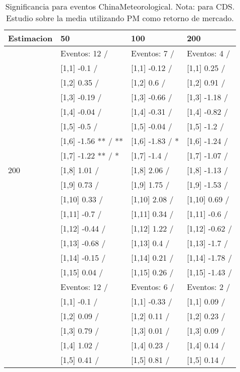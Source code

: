 \begin{table}

\caption{Significancia para eventos ChinaMeteorological. Nota: para CDS. Estudio sobre la media utilizando PM como retorno de mercado.}
\centering
\begin{tabular}[t]{llll}
\toprule
Estimacion & 50 & 100 & 200\\
\midrule
 & Eventos:  12 / & Eventos:  7 / & Eventos:  4 /\\
 & {}[1,1] -0.1  / & {}[1,1] -0.12  / & {}[1,1] 0.25  /\\
 & {}[1,2] 0.35  / & {}[1,2] 0.6  / & {}[1,2] 0.91  /\\
 & {}[1,3] -0.19  / & {}[1,3] -0.66  / & {}[1,3] -1.18  /\\
 & {}[1,4] -0.04  / & {}[1,4] -0.31  / & {}[1,4] -0.82  /\\
\addlinespace
 & {}[1,5] -0.5  / & {}[1,5] -0.04  / & {}[1,5] -1.2  /\\
 & {}[1,6] -1.56 ** / ** & {}[1,6] -1.83  / * & {}[1,6] -1.24  /\\
 & {}[1,7] -1.22 ** / * & {}[1,7] -1.4  / & {}[1,7] -1.07  /\\
200 & {}[1,8] 1.01  / & {}[1,8] 2.06  / & {}[1,8] -1.13  /\\
 & {}[1,9] 0.73  / & {}[1,9] 1.75  / & {}[1,9] -1.53  /\\
\addlinespace
 & {}[1,10] 0.33  / & {}[1,10] 2.08  / & {}[1,10] 0.69  /\\
 & {}[1,11] -0.7  / & {}[1,11] 0.34  / & {}[1,11] -0.6  /\\
 & {}[1,12] -0.44  / & {}[1,12] 1.22  / & {}[1,12] -0.62  /\\
 & {}[1,13] -0.68  / & {}[1,13] 0.4  / & {}[1,13] -1.7  /\\
 & {}[1,14] -0.15  / & {}[1,14] 0.21  / & {}[1,14] -1.78  /\\
\addlinespace
 & {}[1,15] 0.04  / & {}[1,15] 0.26  / & {}[1,15] -1.43  /\\
 & Eventos:  12 / & Eventos:  6 / & Eventos:  2 /\\
 & {}[1,1] -0.1  / & {}[1,1] -0.33  / & {}[1,1] 0.09  /\\
 & {}[1,2] 0.09  / & {}[1,2] 0.11  / & {}[1,2] 0.23  /\\
 & {}[1,3] 0.79  / & {}[1,3] 0.01  / & {}[1,3] 0.09  /\\
\addlinespace
 & {}[1,4] 1.02  / & {}[1,4] 0.23  / & {}[1,4] 0.14  /\\
 & {}[1,5] 0.41  / & {}[1,5] 0.81  / & {}[1,5] 0.14  /\\

\end{tabular}
\end{table}

